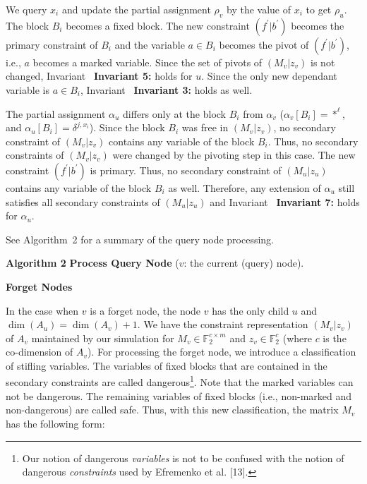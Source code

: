 We query $x_{i}$ and update the partial assignment $\rho_{v}$ by the value of $x_{i}$ to get $\rho_{u}$.
The block $B_{i}$ becomes a fixed block.
The new constraint $(f^{\prime}|b^{\prime})$ becomes the primary constraint of $B_{i}$ and the variable $a\in B_{i}$ becomes the pivot of $(f^{\prime}|b^{\prime})$, i.e., $a$ becomes a marked variable.
Since the set of pivots of $(M_{v}|z_{v})$ is not changed, Invariant \textbf{ Invariant 5:} holds for $u$.
Since the only new dependant variable is $a\in B_{i}$, Invariant \textbf{ Invariant 3:} holds as well.\par




The partial assignment $\alpha_{u}$ differs only at the block $B_{i}$ from $\alpha_{v}$ ($\alpha_{v}[B_{i}]=*^{\ell}$, and $\alpha_{u}[B_{i}]=\delta^{j,x_{i}}$).
Since the block $B_{i}$ was free in $(M_{v}|z_{v})$, no secondary constraint of $(M_{v}|z_{v})$ contains any variable of the block $B_{i}$.
Thus, no secondary constraints of $(M_{v}|z_{v})$ were changed by the pivoting step in this case.
The new constraint $(f^{\prime}|b^{\prime})$ is primary.
Thus, no secondary constraint of $(M_{u}|z_{u})$ contains any variable of the block $B_{i}$ as well.
Therefore, any extension of $\alpha_{u}$ still satisfies all secondary constraints of $(M_{u}|z_{u})$ and Invariant \textbf{ Invariant 7:} holds for $\alpha_{u}$.\par




See Algorithm 2 for a summary of the query node processing.\par



\textbf{Algorithm 2}  \textbf{Process Query Node} ($v$: the current (query) node).





\par\medskip\noindent\textbf{Forget Nodes}\par




In the case when $v$ is a forget node, the node $v$ has the only child $u$ and $\dim(A_{u})=\dim(A_{v})+1$.
We have the constraint representation $(M_{v}|z_{v})$ of $A_{v}$ maintained by our simulation for $M_{v}\in\mathbb{F}_{2}^{c\times m}$ and $z_{v}\in\mathbb{F}_{2}^{c}$ (where $c$ is the co-dimension of $A_{v}$).
For processing the forget node, we introduce a classification of stifling variables.
The variables of fixed blocks that are contained in the secondary constraints are called dangerous\footnote{Our notion of dangerous \emph{variables} is not to be confused with the notion of dangerous \emph{constraints} used by Efremenko et al. [13].}.
Note that the marked variables can not be dangerous.
The remaining variables of fixed blocks (i.e., non-marked and non-dangerous) are called safe.
Thus, with this new classification, the matrix $M_{v}$ has the following form:\par







